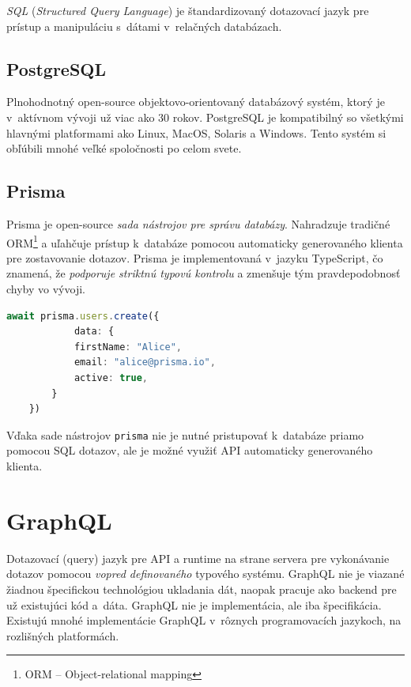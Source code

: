 \noindent \emph{SQL} (\emph{Structured Query Language}) je štandardizovaný dotazovací jazyk pre prístup a manipuláciu s~dátami v~relačných databázach.

\subsection{PostgreSQL}
Plnohodnotný open-source objektovo-orientovaný databázový systém, ktorý je v~aktívnom vývoji už viac ako 30 rokov. PostgreSQL je kompatibilný so všetkými hlavnými platformami ako Linux, MacOS, Solaris a Windows. Tento systém si obľúbili mnohé veľké spoločnosti po celom svete. \cite{PostgreSQL}

\subsection{Prisma}
Prisma je open-source \emph{sada nástrojov pre správu databázy}. Nahradzuje tradičné ORM\footnote{ORM -- Object-relational mapping} a uľahčuje prístup k~databáze pomocou automaticky generovaného klienta pre zostavovanie dotazov. Prisma je implementovaná v~jazyku TypeScript, čo znamená, že \emph{podporuje striktnú typovú kontrolu} a zmenšuje tým pravdepodobnosť chyby vo vývoji. \cite{Prisma} \\

\begin{lstlisting}[language=TypeScript, caption=Príklad tvorby užívateľa pomocou nástroja Prisma. \cite{Prisma}]
	await prisma.users.create({
			data: {
			firstName: "Alice",
			email: "alice@prisma.io",
			active: true,
		}
	})
\end{lstlisting}

\noindent Vďaka sade nástrojov \texttt{prisma} nie je nutné pristupovať k~databáze priamo pomocou SQL dotazov, ale je možné využiť API automaticky generovaného klienta.

\section{GraphQL}
\label{theory:graphql}
Dotazovací (query) jazyk pre API a runtime na strane servera pre vykonávanie dotazov pomocou \emph{vopred definovaného} typového systému. GraphQL nie je viazané žiadnou špecifickou technológiou ukladania dát, naopak pracuje ako backend pre už existujúci kód a~dáta. \cite{GraphQL} GraphQL nie je implementácia, ale iba špecifikácia. Existujú mnohé implementácie GraphQL v~rôznych programovacích jazykoch, na rozlišných platformách. \\

